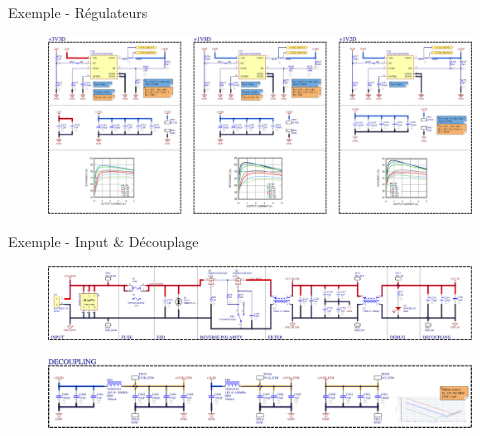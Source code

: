 \begin{frame}{Exemple - Régulateurs}
    \begin{figure}
        \includegraphics[width=\textwidth, height=0.75\textheight, keepaspectratio]{pictures/power-example-3v3.png}
    \end{figure}
\end{frame}


\begin{frame}{Exemple - Input \& Découplage}
    \begin{figure}
        \includegraphics[width=\textwidth, height=0.75\textheight, keepaspectratio]{pictures/power-example-input.png}
    \end{figure}

    \begin{figure}
        \includegraphics[width=\textwidth, height=0.75\textheight, keepaspectratio]{pictures/decoupling-example-eth.png}
    \end{figure}
\end{frame}
